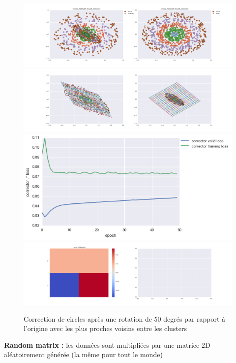 \begin{figure}[H] %
\centering
\includegraphics[width=\linewidth]{fig/24-05-2016/circles/Circles_RotatedK-closest_Corrector-DATA.png}
\includegraphics[width=\linewidth]{fig/24-05-2016/circles/Circles_RotatedK-closest_Corrector-GridCheck.png}
\includegraphics[width=0.45\linewidth]{fig/24-05-2016/circles/Circles_RotatedK-closest_Corrector-Learning_curve.png}
\includegraphics[width=\linewidth]{fig/24-05-2016/circles/Circles_RotatedK-closest_Corrector-W.png}
\caption{Correction de circles après une rotation de 50 degrés par rapport à l'origine avec les plus proches voisins entre les clusters}
\label{fig:recap-circles-rot-exhaustive}
\end{figure}

{\Large \textbf{Random matrix :}} les données sont multipliées par une matrice 2D aléatoirement générée
 (la même pour tout le monde)

